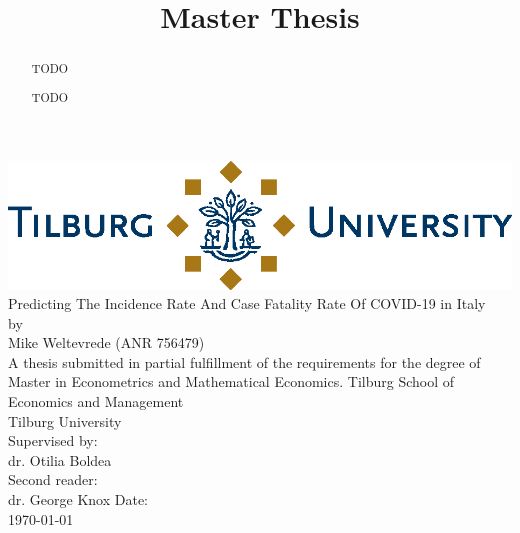 \documentclass[12pt]{article}
\title{Master Thesis}
\newenvironment{acknowledgements}{\renewcommand\abstractname{Acknowledgements}\begin{abstract}} {\end{abstract}}
\newcommand\blankpage{
	\null
	\thispagestyle{empty}
	\addtocounter{page}{-1}
	\newpage}
\begin{document}
	
	\afterpage{\blankpage}
	
	\begin{titlepage}
		\centering
		
		\vfill
		
		\includegraphics[width=\textwidth]{output/TiuLogo.eps}
		\vskip1.5cm
		{\huge
			Predicting The Incidence Rate And Case Fatality Rate Of COVID-19 in Italy\\
			\large\bigskip
			by\\
			Mike Weltevrede (ANR 756479)\\
			\vskip1.5cm
			A thesis submitted in partial fulfillment of the requirements for the degree of Master in Econometrics and Mathematical Economics.
			\vskip0.5cm
			Tilburg School of Economics and Management\\
			Tilburg University\\
			\vskip1.5cm
			Supervised by:\\
			dr. Otilia Boldea \\
			\vskip0.5cm
			Second reader:\\
			dr. George Knox
			\vfill
			Date:\\
			\today
		}   
		\vfill
		\vfill
	\end{titlepage}
	
	\newpage
	
	\newpage
	
	\begin{abstract}
		TODO
	\end{abstract}
	
	\newpage
	
	\begin{acknowledgements}
		TODO
	\end{acknowledgements}
	
\end{document}
